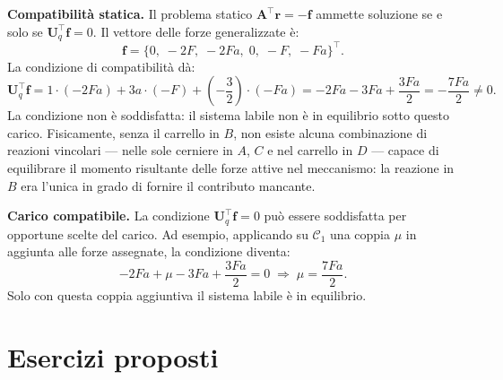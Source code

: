 \begin{esempio}
\begin{svolgimento}
		
		
		\noindent\textbf{Compatibilità statica.}
		Il problema statico $\bm{A}^\top\bm{r} = -\bm{f}$
		ammette soluzione se e solo se
		$\bm{U}_q^\top\bm{f} = 0$. Il vettore delle forze
		generalizzate è:
		\begin{equation*}
			\bm{f} =
			\bigl\{0,\; -2F,\; -2Fa,\;
			0,\; -F,\; -Fa
			\bigr\}^\top.
		\end{equation*}
		La condizione di compatibilità dà:
		\begin{equation*}
			\bm{U}_q^\top\bm{f} =
			1\cdot(-2Fa) + 3a\cdot(-F) +
			\left(-\frac{3}{2}\right)\cdot(-Fa)
			= -2Fa - 3Fa + \frac{3Fa}{2}
			= -\frac{7Fa}{2} \neq 0.
		\end{equation*}
		La condizione non è soddisfatta: il sistema labile
		non è in equilibrio sotto questo carico. Fisicamente,
		senza il carrello in $B$, non esiste alcuna
		combinazione di reazioni vincolari — nelle sole
		cerniere in $A$, $C$ e nel carrello in $D$ ---
		capace di equilibrare il momento risultante delle
		forze attive nel meccanismo: la reazione in $B$
		era l'unica in grado di fornire il contributo
		mancante.
		
		\vspace{6pt}
		\noindent\textbf{Carico compatibile.}
		La condizione $\bm{U}_q^\top\bm{f} = 0$ può
		essere soddisfatta per opportune scelte del
		carico. Ad esempio, applicando su $\mathcal{C}_1$
		una coppia $\mu$ in aggiunta alle forze assegnate,
		la condizione diventa:
		\begin{equation*}
			-2Fa + \mu - 3Fa + \frac{3Fa}{2} = 0
			\;\Longrightarrow\;
			\mu = \frac{7Fa}{2}.
		\end{equation*}
		Solo con questa coppia aggiuntiva il sistema
		labile è in equilibrio.
	\end{svolgimento}
\end{esempio}




\section{Esercizi proposti}

